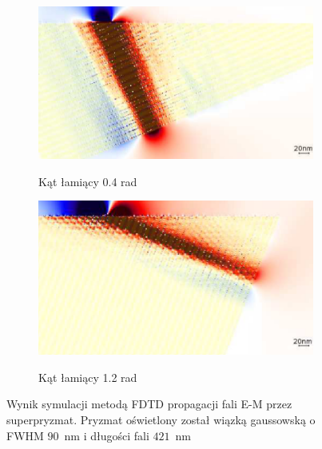 \begin{figure}[btH]
	\centering
			\begin{subfigure}{0.45\textwidth}
				\includegraphics[width=\textwidth]{images/multilayer/prism04.png} \\
				\caption{Kąt łamiący 0.4 rad}
			\end{subfigure}
			\begin{subfigure}{0.45\textwidth}
				\includegraphics[width=\textwidth]{images/multilayer/prism12.png}\\
				\caption{Kąt łamiący 1.2 rad}
			\end{subfigure}
	\caption{Wynik symulacji metodą FDTD propagacji fali E-M przez superpryzmat. Pryzmat oświetlony został wiązką gaussowską o FWHM $90$~nm i długości fali $421$~nm~\cite{prism2010}}
\end{figure}

